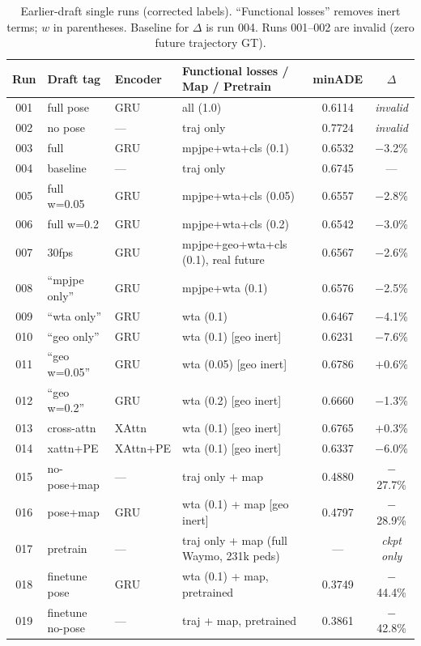 \documentclass{article} %
\newcommand{\minADE}{minADE\xspace}
\begin{document}
\begin{table}[h]
\caption{Earlier-draft single runs (corrected labels). ``Functional losses''
removes inert terms; $w$ in parentheses. Baseline for $\Delta$ is run 004.
Runs 001--002 are invalid (zero future trajectory GT).}
\label{tab:full}
\begin{center}
\small
\begin{tabular}{clllcc}
\toprule
Run & Draft tag & Encoder & Functional losses / Map / Pretrain & \minADE & $\Delta$ \\
\midrule
001 & full pose    & GRU & all (1.0) & 0.6114 & \textit{invalid} \\
002 & no pose      & --- & traj only & 0.7724 & \textit{invalid} \\
\midrule
003 & full     & GRU & mpjpe+wta+cls (0.1)           & 0.6532 & $-$3.2\% \\
004 & baseline & --- & traj only            & 0.6745 & --- \\
005 & full w=0.05 & GRU & mpjpe+wta+cls (0.05)           & 0.6557 & $-$2.8\% \\
006 & full w=0.2  & GRU & mpjpe+wta+cls (0.2)            & 0.6542 & $-$3.0\% \\
007 & 30fps    & GRU & mpjpe+geo+wta+cls (0.1), real future & 0.6567 & $-$2.6\% \\
008 & ``mpjpe only''   & GRU & mpjpe+wta (0.1)     & 0.6576 & $-$2.5\% \\
009 & ``wta only''     & GRU & wta (0.1)            & 0.6467 & $-$4.1\% \\
010 & ``geo only''     & GRU & wta (0.1) [geo inert]        & 0.6231 & $-$7.6\% \\
011 & ``geo w=0.05''   & GRU & wta (0.05) [geo inert]       & 0.6786 & $+$0.6\% \\
012 & ``geo w=0.2''    & GRU & wta (0.2) [geo inert]        & 0.6660 & $-$1.3\% \\
013 & cross-attn   & XAttn & wta (0.1) [geo inert]      & 0.6765 & $+$0.3\% \\
014 & xattn+PE     & XAttn+PE & wta (0.1) [geo inert]   & 0.6337 & $-$6.0\% \\
\midrule
015 & no-pose+map  & --- & traj only + map      & 0.4880 & $-$27.7\% \\
016 & pose+map     & GRU & wta (0.1) + map [geo inert]  & 0.4797 & $-$28.9\% \\
\midrule
017 & pretrain     & --- & traj only + map (full Waymo, 231k peds) & --- & \textit{ckpt only} \\
018 & finetune pose & GRU & wta (0.1) + map, pretrained & 0.3749 & $-$44.4\% \\
019 & finetune no-pose & --- & traj + map, pretrained & 0.3861 & $-$42.8\% \\
\bottomrule
\end{tabular}
\end{center}
\end{table}
\end{document}
